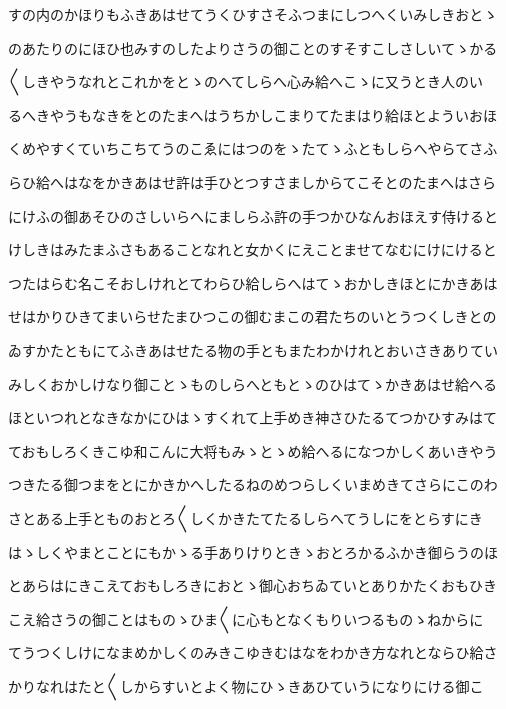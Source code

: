 \documentclass[a4paper,11pt,landscape]{ltjtarticle}
\begin{document}
\par\medskip
すの内のかほりもふきあはせてうくひすさそふつまにしつへくいみしきおとゝ
\par\medskip
のあたりのにほひ也みすのしたよりさうの御ことのすそすこしさしいてゝかる
\par\medskip
〱しきやうなれとこれかをとゝのへてしらへ心み給へこゝに又うとき人のい
\par\medskip
るへきやうもなきをとのたまへはうちかしこまりてたまはり給ほとよういおほ
\par\medskip
くめやすくていちこちてうのこゑにはつのをゝたてゝふともしらへやらてさふ
\par\medskip
らひ給へはなをかきあはせ許は手ひとつすさましからてこそとのたまへはさら
\par\medskip
にけふの御あそひのさしいらへにましらふ許の手つかひなんおほえす侍けると
\par\medskip
けしきはみたまふさもあることなれと女かくにえことませてなむにけにけると
\par\medskip
つたはらむ名こそおしけれとてわらひ給しらへはてゝおかしきほとにかきあは
\par\medskip
せはかりひきてまいらせたまひつこの御むまこの君たちのいとうつくしきとの
\par\medskip
ゐすかたともにてふきあはせたる物の手ともまたわかけれとおいさきありてい
\par\medskip
みしくおかしけなり御ことゝものしらへともとゝのひはてゝかきあはせ給へる
\par\medskip
ほといつれとなきなかにひはゝすくれて上手めき神さひたるてつかひすみはて
\par\medskip
ておもしろくきこゆ和こんに大将もみゝとゝめ給へるになつかしくあいきやう
\par\medskip
つきたる御つまをとにかきかへしたるねのめつらしくいまめきてさらにこのわ
\par\medskip
さとある上手とものおとろ〱しくかきたてたるしらへてうしにをとらすにき
\par\medskip
はゝしくやまとことにもかゝる手ありけりときゝおとろかるふかき御らうのほ
\par\medskip
とあらはにきこえておもしろきにおとゝ御心おちゐていとありかたくおもひき
\par\medskip
こえ給さうの御ことはものゝひま〱に心もとなくもりいつるものゝねからに
\par\medskip
てうつくしけになまめかしくのみきこゆきむはなをわかき方なれとならひ給さ
\par\medskip
かりなれはたと〱しからすいとよく物にひゝきあひていうになりにける御こ
\par\medskip
\end{document}
